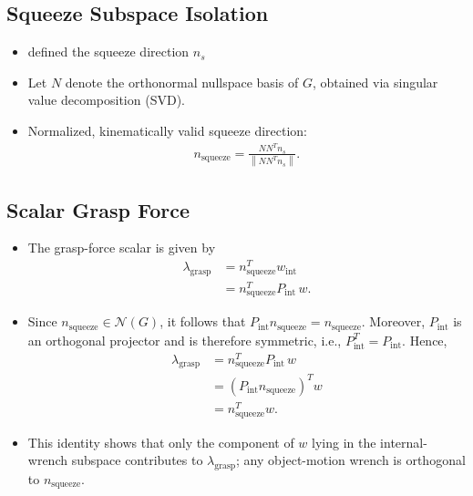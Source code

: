 \documentclass[conference]{IEEEtran}
\begin{document}
\subsection*{Squeeze Subspace Isolation}

\begin{itemize}
    \item defined the squeeze direction $n_s$ 

    \item Let \(N\) denote the orthonormal nullspace basis of \(G\), obtained via singular value decomposition (SVD).

    \item Normalized, kinematically valid squeeze direction:
    \begin{align}
        n_{\mathrm{squeeze}}
        =
        \frac{N N^{T} n_s}
        {\left\lVert N N^{T} n_s \right\rVert}.
    \end{align}
\end{itemize}

\subsection*{Scalar Grasp Force}
\begin{itemize}
    \item The grasp-force scalar is given by
    \begin{align}
        \lambda_{\mathrm{grasp}}
        &= n_{\mathrm{squeeze}}^{T} w_{\mathrm{int}} \\
        &= n_{\mathrm{squeeze}}^{T} P_{\mathrm{int}}\, w.
    \end{align}

    \item Since \(n_{\mathrm{squeeze}} \in \mathcal{N}(G)\), it follows that
    \(P_{\mathrm{int}} n_{\mathrm{squeeze}} = n_{\mathrm{squeeze}}\). Moreover,
    \(P_{\mathrm{int}}\) is an orthogonal projector and is therefore symmetric,
    i.e., \(P_{\mathrm{int}}^{T} = P_{\mathrm{int}}\). Hence,
    \begin{align}
        \lambda_{\mathrm{grasp}}
        &= n_{\mathrm{squeeze}}^{T} P_{\mathrm{int}}\, w \\
        &= \left(P_{\mathrm{int}} n_{\mathrm{squeeze}}\right)^{T} w \\
        &= n_{\mathrm{squeeze}}^{T} w.
    \end{align}

    \item This identity shows that only the component of \(w\) lying in the
    internal-wrench subspace contributes to \(\lambda_{\mathrm{grasp}}\); any
    object-motion wrench is orthogonal to \(n_{\mathrm{squeeze}}\).
\end{itemize}
\end{document}
